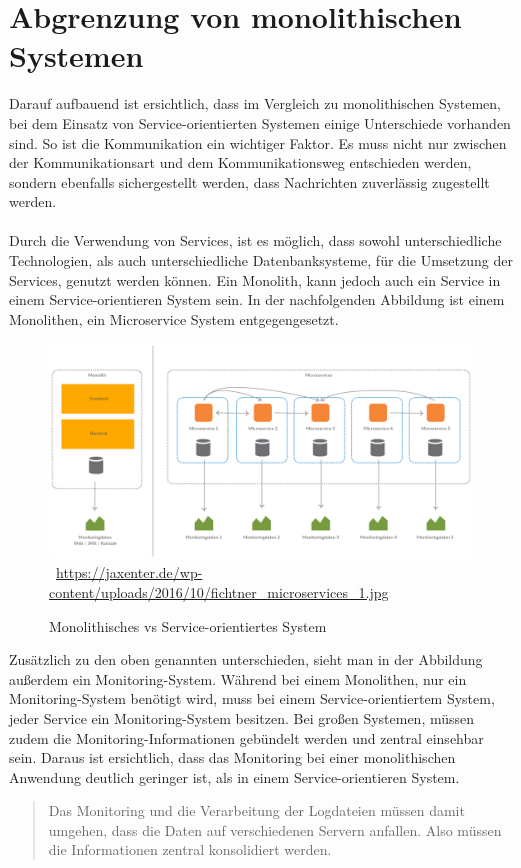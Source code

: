 \section{Abgrenzung von monolithischen Systemen}
\label{sec:AbgrenzungVonMonolithischenSystemen}
Darauf aufbauend ist ersichtlich, dass im Vergleich zu monolithischen Systemen, bei dem Einsatz von Service-orientierten Systemen einige Unterschiede vorhanden sind. So ist die Kommunikation ein wichtiger Faktor. Es muss nicht nur zwischen der Kommunikationsart und dem Kommunikationsweg entschieden werden, sondern ebenfalls sichergestellt werden, dass Nachrichten zuverlässig zugestellt werden.
\\\\
Durch die Verwendung von Services, ist es möglich, dass sowohl unterschiedliche Technologien, als auch unterschiedliche Datenbanksysteme, für die Umsetzung der Services, genutzt werden können. Ein Monolith, kann jedoch auch ein Service in einem Service-orientieren System sein. In der nachfolgenden Abbildung ist einem Monolithen, ein Microservice System entgegengesetzt.
\begin{figure}[htb]
    \centering 
    \includegraphics[width=\linewidth]{content/images/fichtner_microservices_1}\
    \quelle\url{https://jaxenter.de/wp-content/uploads/2016/10/fichtner_microservices_1.jpg}
    \caption{Monolithisches vs Service-orientiertes System}
    \label{fig:BoundedContext}  
\end{figure}
Zusätzlich zu den oben genannten unterschieden, sieht man in der Abbildung außerdem ein Monitoring-System. Während bei einem Monolithen, nur ein Monitoring-System benötigt wird, muss bei einem Service-orientiertem System, jeder Service ein Monitoring-System besitzen. Bei großen Systemen, müssen zudem die Monitoring-Informationen gebündelt werden und zentral einsehbar sein. Daraus ist ersichtlich, dass das Monitoring bei einer monolithischen Anwendung deutlich geringer ist, als in einem Service-orientieren System.

\begin{quotation}
	\frqq Das Monitoring und die Verarbeitung der Logdateien müssen damit umgehen, dass die Daten auf verschiedenen Servern anfallen. Also müssen die Informationen zentral konsolidiert werden.\flqq\ \cite[S. 18]{EWolff2016:Microservices}
\end{quotation}
